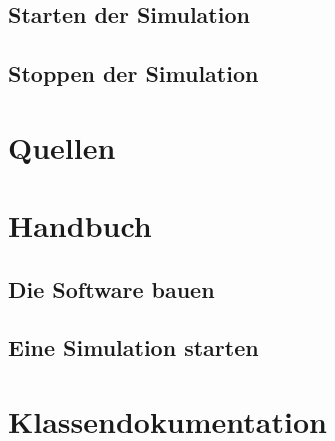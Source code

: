 \documentclass[14pt, a4paper]{report}
\begin{document}
\section{Starten der Simulation}
\section{Stoppen der Simulation}

\chapter{Quellen}

\appendix
\chapter{Handbuch}
\tableofcontents
\section{Die Software bauen}
\section{Eine Simulation starten}


\chapter{Klassendokumentation}
\newpage
\end{document}

